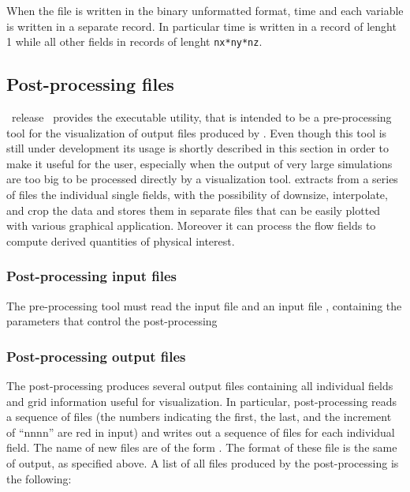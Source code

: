 When the file is written in the binary unformatted format,
time and each variable is written in a separate record.
In particular time is written in a record of lenght 1
while all other fields in records of lenght {\tt nx*ny*nz}.

\subsection{Post-processing files}
\label{sect:pp}

\PDAC\ release \PDACVERSION\ provides the executable  utility,
that is intended to be a pre-processing tool for the visualization of
output files produced by \PDAC. Even though this tool is still under 
development its usage is shortly described in this section in order to make it
useful for the user, especially when the output of very large simulations
are too big to be processed directly by a visualization tool.
 extracts from a series of  files the individual single fields,
with the possibility of downsize, interpolate, and crop the data
and stores them in separate files that can be easily plotted with
various graphical application. Moreover it can process the flow fields to
compute derived quantities of physical interest.

\subsubsection{Post-processing input files}

The pre-processing tool must read the input file  and an
input file , containing the parameters that control the post-processing

\subsubsection{Post-processing output files}

The post-processing produces several output files
containing all individual fields and grid information useful
for visualization.
In particular, post-processing  reads a sequence
of  files (the numbers indicating the first, the last, and
the increment of ``nnnn'' are red in input)
and writes out a sequence of files for each individual field.
The name of new files are of the form .
The format of these file is the same of output, as specified above.
A list of all files produced by the post-processing is the following:

